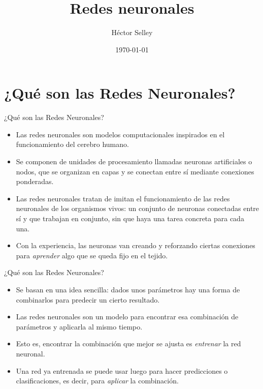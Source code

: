 \documentclass[11pt,aspectratio=169]{beamer}
\author{Héctor Selley}
\title{Redes neuronales}
\institute{Universidad Anáhuac México}
\date{\today}
\begin{document}

\begin{frame}
	\titlepage
\end{frame}


\section{¿Qué son las Redes Neuronales?}
\begin{frame}{¿Qué son las Redes Neuronales?}
	\begin{itemize}
		\item Las redes neuronales son modelos computacionales inspirados en el funcionamiento del cerebro humano. \pause
		\item Se componen de unidades de procesamiento llamadas neuronas artificiales o nodos, que se organizan en 
			capas y se conectan entre sí mediante conexiones ponderadas.\pause
		\item Las redes neuronales tratan de imitan el funcionamiento de las redes neuronales de los organismos vivos:
			 un conjunto de neuronas conectadas entre sí y que trabajan en conjunto, sin que haya una tarea concreta para cada una.\pause
		\item Con la experiencia, las neuronas van creando y reforzando ciertas conexiones para \textit{aprender} algo que se queda fijo en el tejido.
	\end{itemize}
\end{frame}

\begin{frame}{¿Qué son las Redes Neuronales?}
	\begin{itemize}
		\item Se basan en una idea sencilla: dados unos parámetros hay una forma de combinarlos para predecir un cierto resultado.\pause
		\item Las redes neuronales son un modelo para encontrar esa combinación de parámetros y aplicarla al mismo tiempo. \pause 
		\item Esto es, encontrar la combinación que mejor se ajusta es \textit{entrenar} la red neuronal. \pause 
		\item Una red ya entrenada se puede usar luego para hacer predicciones o clasificaciones, es decir, para \textit{aplicar} la combinación.
	\end{itemize}
\end{frame}
\end{document}
